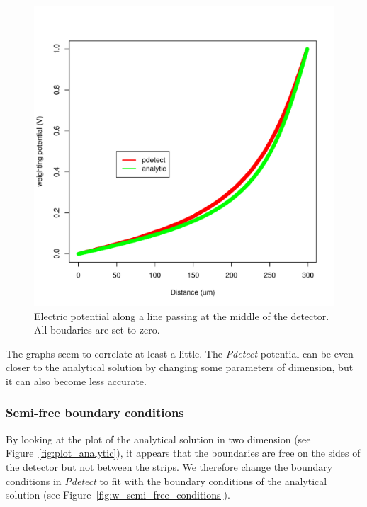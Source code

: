 \documentclass[11pt]{article}
\begin{document}
			\begin{figure}[H]
				\center
				\includegraphics[scale=0.5]{images/boundary_conditions/zero.pdf}
				\caption{Electric potential along a line passing at the middle of the detector.
						All boudaries are set to zero.}
				\label{fig:zero_conditions}
			\end{figure}
\newpage
			The graphs seem to correlate at least a little. The \textit{Pdetect} potential can
			be even closer to the analytical solution by changing some parameters of dimension,
			but it can also become less accurate.

		\subsubsection{Semi-free boundary conditions}

			By looking at the plot of the analytical solution in two dimension
			(see Figure~\ref{fig:plot_analytic}), it appears that the boundaries are
			free on the sides of the detector but not between the strips. We therefore change
			the boundary conditions in \textit{Pdetect} to fit with the boundary conditions of
			the analytical solution (see Figure~\ref{fig:w_semi_free_conditions}).
\end{document}

